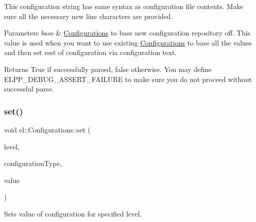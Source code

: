 This configuration string has same syntax as configuration file contents. Make sure all the necessary new line characters are provided. 
\begin{DoxyParams}{Parameters}
{\em base} & \hyperlink{classel_1_1_configurations}{Configurations} to base new configuration repository off. This value is used when you want to use existing \hyperlink{classel_1_1_configurations}{Configurations} to base all the values and then set rest of configuration via configuration text. \\
\hline
\end{DoxyParams}
\begin{DoxyReturn}{Returns}
True if successfully parsed, false otherwise. You may define \textquotesingle{}E\+L\+P\+P\+\_\+\+D\+E\+B\+U\+G\+\_\+\+A\+S\+S\+E\+R\+T\+\_\+\+F\+A\+I\+L\+U\+RE\textquotesingle{} to make sure you do not proceed without successful parse. 
\end{DoxyReturn}
\mbox{\label{classel_1_1_configurations_a332717de96efc851a202b7afcc5e395c}} 
\subsubsection{\texorpdfstring{set()}{set()}\hspace{0.1cm}{\footnotesize\ttfamily [1/2]}}
{\footnotesize\ttfamily void el\+::\+Configurations\+::set (\begin{DoxyParamCaption}\item[{\hyperlink{namespaceel_ab0ac6091262344c52dd2d3ad099e8e36}{Level}}]{level,  }\item[{\hyperlink{namespaceel_a281f5db6d6163678bc68a8b23b59e124}{Configuration\+Type}}]{configuration\+Type,  }\item[{const std\+::string \&}]{value }\end{DoxyParamCaption})\hspace{0.3cm}{\ttfamily [inline]}}



Sets value of configuration for specified level. 


